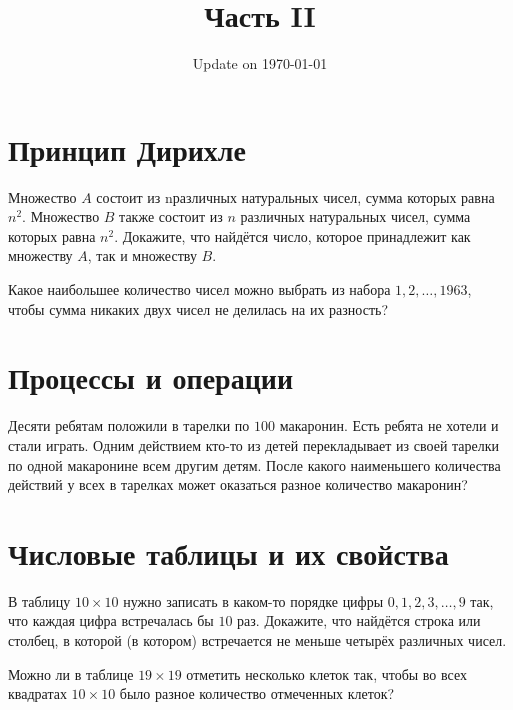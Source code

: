 \documentclass[12pt]{article}
\begin{document}
\fontsize{12}{12}\selectfont

\title{\bf \huge Часть II}
\date{Update on \today}
\maketitle 


\section*{Принцип Дирихле}

\begin{task}
Множество $A$ состоит из nразличных натуральных чисел, сумма которых равна $n^{2}$. Множество $B$ также состоит из $n$ различных натуральных чисел, сумма которых равна $n^{2}$. Докажите, что найдётся число, которое принадлежит как множеству $A$, так и множеству $B$.
\end{task}

\begin{task} 
Какое наибольшее количество чисел можно выбрать из набора $1, 2, \dots, 1963$, чтобы сумма никаких двух чисел не делилась на их разность?
\end{task}
 

\section*{Процессы и операции}

\begin{task}
Десяти ребятам положили в тарелки по $100$ макаронин. Есть ребята не хотели и стали играть. Одним действием кто-то из детей перекладывает из своей тарелки по одной макаронине всем другим детям. После какого наименьшего количества действий у всех в тарелках может оказаться разное количество макаронин?
\end{task}

\section*{Числовые таблицы и их свойства}

\begin{task}
В таблицу $10 \times 10$ нужно записать в каком-то порядке цифры  $0, 1, 2, 3, \dots, 9$  так, что каждая цифра встречалась бы $10$ раз. Докажите, что найдётся строка или столбец, в которой (в котором) встречается не меньше четырёх различных чисел. 
\end{task}

\begin{task} Можно ли в таблице $19 \times 19$ отметить несколько клеток так, чтобы во всех квадратах $10 \times 10$ было разное количество отмеченных клеток?
\end{task}
\end{document}
